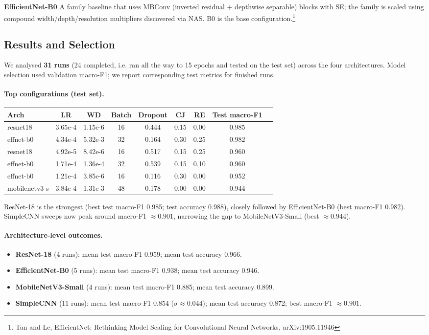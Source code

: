 \documentclass[11pt,a4paper]{article}
\begin{document}
\textbf{EfficientNet-B0}\; A family baseline that uses MBConv (inverted residual + depthwise separable) blocks with SE; the family is scaled using compound width/depth/resolution multipliers discovered via NAS. B0 is the base configuration.\footnote{Tan and Le, EfficientNet: Rethinking Model Scaling for Convolutional Neural Networks, arXiv:1905.11946}

\subsection{Results and Selection}
We analysed \textbf{31 runs} (24 completed, i.e. ran all the way to 15 epochs and tested on the test set) across the four architectures. Model selection used validation macro-F1; we report corresponding test metrics for finished runs.

\paragraph{Top configurations (test set).}
\begin{center}
\begin{tabular}{lcccccccc}
\toprule
Arch & LR & WD & Batch & Dropout & CJ & RE & Test macro-F1 \\
\midrule
resnet18 & 3.65e-4 & 1.15e-6 & 16 & 0.444 & 0.15 & 0.00 & 0.985 \\
effnet-b0 & 4.34e-4 & 5.32e-3 & 32 & 0.164 & 0.30 & 0.25 & 0.982 \\
resnet18 & 4.92e-5 & 8.42e-6 & 16 & 0.517 & 0.15 & 0.25 & 0.960 \\
effnet-b0 & 1.71e-4 & 1.36e-4 & 32 & 0.539 & 0.15 & 0.10 & 0.960 \\
effnet-b0 & 1.21e-4 & 3.85e-6 & 16 & 0.116 & 0.30 & 0.00 & 0.952 \\
mobilenetv3-s & 3.84e-4 & 1.31e-3 & 48 & 0.178 & 0.00 & 0.00 & 0.944 \\
\bottomrule
\end{tabular}
\end{center}

ResNet-18 is the strongest (best test macro-F1 0.985; test accuracy 0.988), closely followed by EfficientNet-B0 (best macro-F1 0.982). SimpleCNN sweeps now peak around macro-F1 $\approx 0.901$, narrowing the gap to MobileNetV3-Small (best $\approx 0.944$).

\paragraph{Architecture-level outcomes.}
\begin{itemize}
  \item \textbf{ResNet-18} (4 runs): mean test macro-F1 0.959; mean test accuracy 0.966.
  \item \textbf{EfficientNet-B0} (5 runs): mean test macro-F1 0.938; mean test accuracy 0.946.
  \item \textbf{MobileNetV3-Small} (4 runs): mean test macro-F1 0.885; mean test accuracy 0.899.
  \item \textbf{SimpleCNN} (11 runs): mean test macro-F1 0.854 ($\sigma\!\approx\!0.044$); mean test accuracy 0.872; best macro-F1 $\approx\!0.901$.
\end{itemize}
\end{document}
